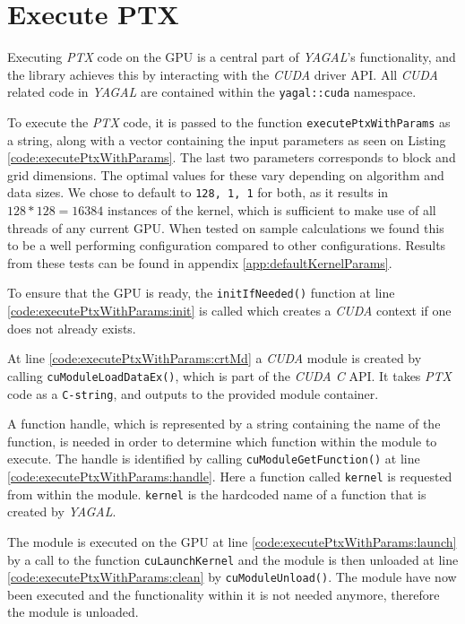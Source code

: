 \section{Execute PTX} \label{cha:execPtx}
Executing \textit{PTX} code on the GPU is a central part of \textit{YAGAL}'s functionality, and the library achieves this by interacting with the \textit{CUDA} driver API. All \textit{CUDA} related code in \textit{YAGAL} are contained within the \texttt{yagal::cuda} namespace.

To execute the \textit{PTX} code, it is passed to the function \texttt{executePtxWithParams} as a string, along with a vector containing the input parameters as seen on Listing \ref{code:executePtxWithParams}. The last two parameters corresponds to block and grid dimensions. The optimal values for these vary depending on algorithm and data sizes. We chose to default to \texttt{128, 1, 1} for both, as it results in $128*128=16384$ instances of the kernel, which is sufficient to make use of all threads of any current GPU. When tested on sample calculations we found this to be a well performing configuration compared to other configurations. Results from these tests can be found in appendix \ref{app:defaultKernelParams}.

To ensure that the GPU is ready, the \texttt{initIfNeeded()} function at line \ref{code:executePtxWithParams:init} is called which creates a \textit{CUDA} context if one does not already exists.

At line \ref{code:executePtxWithParams:crtMd} a \textit{CUDA} module is created by calling \texttt{cuModuleLoadDataEx()}, which is part of the \textit{CUDA C} API. It takes \textit{PTX} code as a \texttt{C-string}, and outputs to the provided module container.

A function handle, which is represented by a string containing the name of the function, is needed in order to determine which function within the module to execute. The handle is identified by calling \texttt{cuModuleGetFunction()} at line \ref{code:executePtxWithParams:handle}. Here a function called \texttt{kernel} is requested from within the module. \texttt{kernel} is the hardcoded name of a function that is created by \textit{YAGAL}.

The module is executed on the GPU at line \ref{code:executePtxWithParams:launch} by a call to the function \texttt{cuLaunchKernel} and the module is then unloaded at line \ref{code:executePtxWithParams:clean} by \texttt{cuModuleUnload()}. The module have now been executed and the functionality within it is not needed anymore, therefore the module is unloaded.

